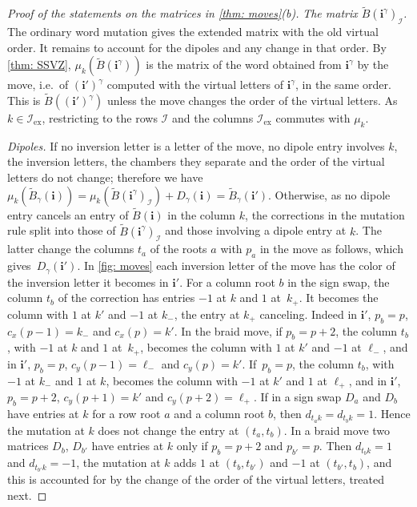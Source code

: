 \documentclass[a4paper]{amsart}
\numberwithin{equation}{section}
\theoremstyle{definition}
\theoremstyle{remark}
\newcommand{\mcI}{\mathcal{I}}
\newcommand{\bfi}{\mathbf{i}}
\newcommand{\tB}{\widetilde{B}}
\newcommand{\ex}{\mathrm{ex}}
\begin{document}
\begin{proof}[Proof of the statements on the matrices in \cref{thm: moves}(b)]
  \emph{The matrix $\tB(\bfi^\gamma)_\mcI$.} The ordinary word mutation gives the extended matrix with the old virtual order.
  It remains to account for the dipoles and any change in that order.
  By \cref{thm: SSVZ}, $\mu_k(\tB(\bfi^\gamma))$ is the matrix of the word obtained from $\bfi^\gamma$ by the move, i.e.\ of $(\bfi')^\gamma$ computed with the virtual letters of $\bfi^\gamma$, in the same order.
  This is $\tB((\bfi')^\gamma)$ unless the move changes the order of the virtual letters.
  As $k\in \mcI_\ex$, restricting to the rows $\mcI$ and the columns $\mcI_\ex$ commutes with $\mu_k$.

  \emph{Dipoles.} If no inversion letter is a letter of the move, no dipole entry involves $k$, the inversion letters, the chambers they separate and the order of the virtual letters do not change; therefore we have $\mu_k(\tB_\gamma(\bfi))=\mu_k(\tB(\bfi^\gamma)_\mcI)+D_\gamma(\bfi)=\tB_\gamma(\bfi')$.
  Otherwise, as no dipole entry cancels an entry of $\tB(\bfi)$ in the column $k$, the corrections in the mutation rule split into those of $\tB(\bfi^\gamma)_\mcI$ and those involving a dipole entry at $k$.
  The latter change the columns $t_a$ of the roots $a$ with $p_a$ in the move as follows, which gives~$D_\gamma(\bfi')$.
  In \cref{fig: moves} each inversion letter of the move has the color of the inversion letter it becomes in $\bfi'$.
  For a column root $b$ in the sign swap, the column $t_b$ of the correction has entries $-1$ at $k$ and $1$ at~$k_+$.
  It becomes the column with $1$ at $k'$ and $-1$ at $k_-$, the entry at $k_+$ canceling.
  Indeed in $\bfi'$, $p_b=p$, $c_x(p-1)=k_-$ and $c_x(p)=k'$.
  In the braid move, if $p_b=p+2$, the column $t_b$, with $-1$ at $k$ and $1$ at~$k_+$, becomes the column with $1$ at $k'$ and $-1$ at $\ell_-$, and in $\bfi'$, $p_b=p$, $c_y(p-1)=\ell_-$ and $c_y(p)=k'$.
  If~$p_b=p$, the column $t_b$, with $-1$ at $k_-$ and $1$ at $k$, becomes the column with $-1$ at $k'$ and $1$ at $\ell_+$, and in $\bfi'$, $p_b=p+2$, $c_y(p+1)=k'$ and $c_y(p+2)=\ell_+$.
  If in a sign swap $D_a$ and $D_b$ have entries at $k$ for a row root $a$ and a column root $b$, then $d_{t_ak}=d_{t_bk}=1$.
  Hence the mutation at $k$ does not change the entry at $(t_a,t_b)$.
  In a braid move two matrices $D_b$, $D_{b'}$ have entries at $k$ only if $p_b=p+2$ and $p_{b'}=p$.
  Then $d_{t_bk}=1$ and $d_{t_{b'}k}=-1$, the mutation at $k$ adds $1$ at $(t_b,t_{b'})$ and $-1$ at $(t_{b'},t_b)$, and this is accounted for by the change of the order of the virtual letters, treated next.


\end{proof}
\end{document}
